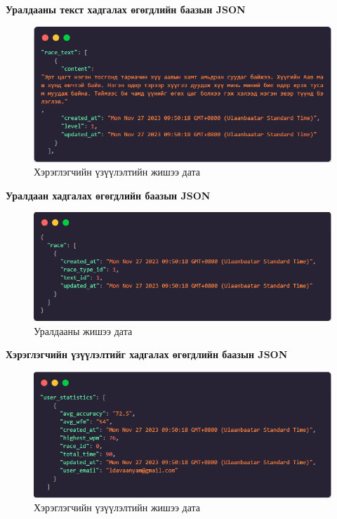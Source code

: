 \textbf{Уралдааны текст хадгалах өгөгдлийн баазын JSON}

\begin{figure}[h]
	\centering
	\includegraphics[width=15cm]{images/race_text_json.png}
	\caption{Хэрэглэгчийн үзүүлэлтийн жишээ дата}
	\label{fig:erd}
\end{figure}

\pagebreak

\textbf{Уралдаан хадгалах өгөгдлийн баазын JSON}

\begin{figure}[h]
	\centering
	\includegraphics[width=15cm]{images/race_json.png}
	\caption{Уралдааны жишээ дата}
	\label{fig:erd}
\end{figure}

\textbf{Хэрэглэгчийн үзүүлэлтийг хадгалах өгөгдлийн баазын JSON}

\begin{figure}[h]
	\centering
	\includegraphics[width=15cm]{images/statistics_json.png}
	\caption{Хэрэглэгчийн үзүүлэлтийн жишээ дата}
	\label{fig:erd}
\end{figure}

